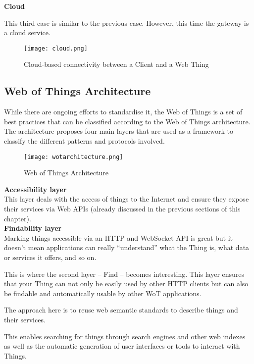 \textbf{Cloud}

This third case is similar to the previous case. However, this time the gateway
is a cloud service.

\begin{figure}[H]
  \centering
  \texttt{[image: cloud.png]}
  \caption{Cloud-based connectivity between a Client and a Web Thing}
  \label{fig:cloud}
\end{figure}

\subsection{Web of Things Architecture}

While there are ongoing efforts to standardise it, the Web of Things is a set 
of best practices that can be classified according to the Web of Things
architecture.
The architecture proposes four main layers that are used as a framework to
classify the different patterns and protocols involved.

\begin{figure}[H]
  \centering
  \texttt{[image: wotarchitecture.png]}
  \caption{Web of Things Architecture}
  \label{fig:wotarchitecture}
\end{figure}

\textbf{Accessibility layer}\\

This layer deals with the access of things to the
Internet and ensure they expose their services via Web APIs
(already discussed in the previous sections of this chapter).\\

\textbf{Findability layer}\\

Marking things accessible via an HTTP and WebSocket API is great but it doesn't
mean applications can really  ``understand'' what the Thing is, what data or
services it offers, and so on.

This is where the second layer – Find – becomes interesting.
This layer ensures that your Thing can not only be easily used by other HTTP
clients but can also be findable and automatically usable by other WoT
applications.

The approach here is to reuse web semantic standards to describe things and
their services.

This enables searching for things through search engines and other web indexes
as well as the automatic generation of user interfaces or tools to interact with
Things.\\

